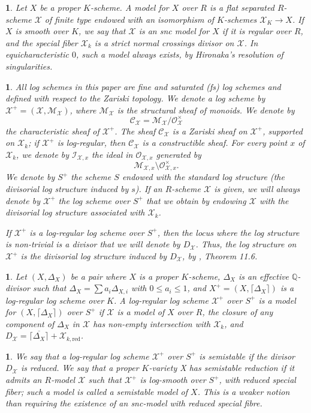 \documentclass{amsart}%
\numberwithin{equation}{subsection}
\theoremstyle{plain2}
\theoremstyle{definition2}
\theoremstyle{stepstyle}
\theoremstyle{point}
\theoremstyle{subpoint}
\newtheorem{subpoint}[equation]{}%
\newcommand{\spa}[1]{\begin{subpoint}#1\end{subpoint}}           %
\newcommand{\Q}{\ensuremath{\mathbb{Q}}}
\newcommand{\cX}{\ensuremath{\mathscr{X}}}
\newcommand{\caM}{\ensuremath{\mathcal{M}}}
\newcommand{\caC}{\ensuremath{\mathcal{C}}}
\newcommand{\redu}{\mathrm{red}}
\begin{document}
\spa{Let $X$ be a proper $K$-scheme. A model for $X$ over $R$ is a flat separated $R$-scheme $\cX$ of finite type endowed with an isomorphism of $K$-schemes $\cX_K \rightarrow X$. If $X$ is smooth over $K$,
we say that $\cX$ is an snc model for $X$ if it is regular over $R$, and the
special fiber $\cX_k$ is a strict normal crossings divisor on $\cX$. In equicharacteristic $0$, such a model always exists, by Hironaka's resolution of singularities.}

\spa{ \label{sss-log} All log schemes in this paper are  fine and saturated (\emph{fs}) log schemes and defined with respect to the Zariski topology. We denote a log scheme by $\cX^+=(\cX,\caM_{\cX})$, where $\caM_{\cX}$ is the structural sheaf of monoids. We denote by $$\mathcal{C}_{\cX}=\mathcal{M}_{\cX}/\mathcal{O}_{\cX}^{\times}$$
the characteristic sheaf of $\cX^+$. The sheaf $\mathcal{C}_{\cX}$
is a Zariski sheaf on $\cX^+$, supported on $\cX_k$; if $\cX^+$ is log-regular, then $\caC_{\cX}$ is a constructible sheaf.
For every point $x$ of $\cX_k$, we denote by $\mathcal{I}_{\cX,x}$
the ideal in $\mathcal{O}_{\cX,x}$ generated by
$$\mathcal{M}_{\cX,x}\setminus \mathcal{O}_{\cX,x}^{\times}.$$ We denote
by $S^+$ the scheme $S$ endowed with the standard log structure
(the divisorial log structure induced by $s$). If an $R$-scheme $\cX$ is given, we will always denote by $\cX^+$ the log scheme over $S^+$ that we obtain by endowing $\cX$ with the divisorial log structure associated with
$\cX_k$.

If $\cX^+$ is a log-regular log scheme over $S^+$, then the locus where the log structure is non-trivial is a divisor that we will denote by $D_{\cX}$. Thus, the log structure on $\cX^+$ is the divisorial log structure induced by $D_{\cX}$, by \cite{Kato1994a}, Theorem 11.6.

}

\spa{Let $(X,\Delta_X)$ be a pair where $X$ is a proper $K$-scheme, $\Delta_X$ is an effective $\Q$-divisor such that $\Delta_X= \sum a_i \Delta_{X,i}$ with $0 \leqslant a_i \leqslant 1$, and $X^+=(X,\lceil \Delta_X \rceil)$ is a log-regular log scheme over $K$. A log-regular log scheme $\cX^+$ over $S^+$ is a model for $(X,\lceil \Delta_X \rceil)$ over $S^+$ if $\cX$ is a model of $X$ over $R$, the closure of any component of $\Delta_X$ in $\cX$ has non-empty intersection with $\cX_k$, and $D_\cX = \overline{\lceil \Delta_X \rceil} + \cX_{k,\redu}$. }

\spa{We say that a log-regular log scheme $\cX^+$ over $S^+$ is semistable if the divisor $D_\cX$ is reduced. We say that a proper $K$-variety X has semistable reduction if it admits an $R$-model $\cX$ such that $\cX^+$ is log-smooth over $S^+$, with reduced special fiber; such a model is called a semistable model of $X$. This is a weaker notion than requiring the existence of an snc-model with reduced special fibre.}
\end{document}
